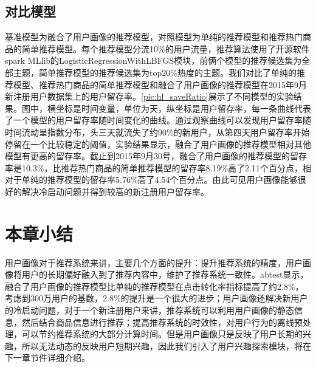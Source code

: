       \subsection{对比模型}
      基准模型为融合了用户画像的推荐模型，对照模型为单纯的推荐模型和推荐热门商品的简单推荐模型。每个推荐模型分流10\%的用户流量，推荐算法使用了开源软件spark MLlib的LogisticRegressionWithLBFGS模块，前俩个模型的推荐候选集为全部主题，简单推荐模型的推荐候选集为top20\%热度的主题。我们对比了单纯的推荐模型、推荐热门商品的简单推荐模型和融合了用户画像的推荐模型在2015年9月新注册用户数据集上的用户留存率。\autoref{pic:hl_saveRatio}展示了不同模型的实验结果。图中，横坐标是时间变量，单位为天，纵坐标是用户留存率，每一条曲线代表了一个模型的用户留存率随时间变化的曲线。通过观察曲线可以发现用户留存率随时间流动呈指数分布，头三天就流失了约90\%的新用户，从第四天用户留存率开始停留在一个比较稳定的阈值，实验结果显示，融合了用户画像的推荐模型相对其他模型有更高的留存率。截止到2015年9月30号，融合了用户画像的推荐模型的留存率是10.3\%，比推荐热门商品的简单推荐模型的留存率8.19\%高了2.11个百分点，相对于单纯的推荐模型的留存率5.76\%高了4.54个百分点。由此可见用户画像能够很好的解决冷启动问题并得到较高的新注册用户留存率。
      \begin{figure}
      \centering
        \label{pic:hl_saveRatio}
      \end{figure}

    \section{本章小结}
      用户画像对于推荐系统来讲，主要几个方面的提升：提升推荐系统的精度，用户画像将用户的长期偏好融入到了推荐内容中，维护了推荐系统一致性。abtest显示，融合了用户画像的推荐模型比单纯的推荐模型在点击转化率指标提高了约2.8\%，考虑到300万用户的基数，2.8\%的提升是一个很大的进步；用户画像还解决新用户的冷启动问题，对于一个新注册用户来讲，推荐系统可以利用用户画像的静态信息，然后结合商品信息进行推荐；提高推荐系统的时效性，对用户行为的离线预处理，可以节约推荐系统的大部分计算时间。但是用户画像只是反映了用户长期的兴趣，所以无法动态的反映用户短期兴趣，因此我们引入了用户兴趣探索模块，将在下一章节件详细介绍。
